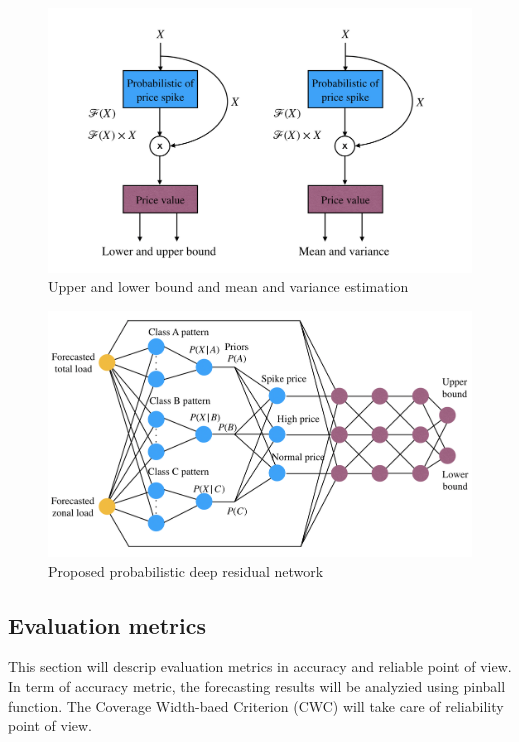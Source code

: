 \documentclass[review]{elsarticle}
\begin{document}
    \begin{figure}[H]
      \caption{Upper and lower bound and mean and variance estimation}
      \label{Fig:UB_LB_MV_PDRN}
      \includegraphics[width=12cm]{UB_LB_MV_PDRN}
    \centering
    \end{figure}

    \begin{figure}[H]
      \caption{Proposed probabilistic deep residual network}
      \label{Fig:proposed_PDRN}
      \includegraphics[width=12cm]{proposed_PDRN}
    \centering
    \end{figure}

  \subsection{Evaluation metrics}
    This section will descrip evaluation metrics in accuracy and reliable point of view. In term of accuracy metric, the forecasting results will be analyzied using pinball function. The Coverage Width-baed Criterion (CWC) will take care of reliability point of view.
\end{document}
